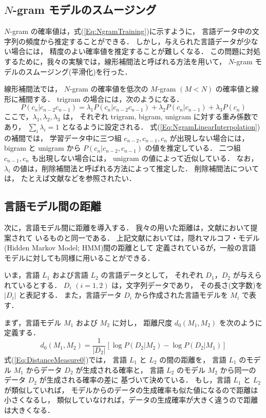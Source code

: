 \subsection{$N$-gram モデルのスムージング}

$N$-gram の確率値は，式(\ref{Eq:NgramTraining})に示すように，
言語データ中の文字列の頻度から推定することができる．
しかし，与えられた言語データが少ない場合には，
精度のよい確率値を推定することが難しくなる．
この問題に対処するために，我々の実験では，線形補間法と呼ばれる方法を用いて，
$N$-gram モデルのスムージング(平滑化)を行った．

線形補間法では，
$N$-gram の確率値を低次の $M$-gram $(M < N)$ の確率値と線形に補間する．
trigram の場合には，次のようになる．
\begin{equation}
  P(c_{n}|c_{n-2} c_{n-1})
 = \lambda_{1} P(c_{n}|c_{n-2} c_{n-1})
   + \lambda_{2} P(c_{n}|c_{n-1}) + \lambda_{3} P(c_{n})
\label{Eq:NgramLinearInterpolation}
\end{equation}
ここで，$\lambda_{1},\lambda_{2},\lambda_{3}$ は，
それぞれ trigram, bigram, unigram に対する重み係数であり，
$\displaystyle \sum_{i} \lambda_{i} = 1$ となるように設定される．
式(\ref{Eq:NgramLinearInterpolation})の補間では，
学習データ中に三つ組 $c_{n-2}, c_{n-1}, c_{n}$ が出現しない場合には，
bigram と unigram から $P(c_{n}|c_{n-2}, c_{n-1})$ の値を推定している．
二つ組 $c_{n-1}, c_{n}$ も出現しない場合には，
unigram の値によって近似している．
なお，$\lambda_{i}$ の値は，削除補間法と呼ばれる方法によって推定した．
削除補間法については，
たとえば文献\cite{Jelinek80,Kita96Book}などを参照されたい．


\subsection{言語モデル間の距離}

次に，言語モデル間に距離を導入する．
我々の用いた距離は，文献\cite{Juang85,Rabiner93}において提案されて
いるものと同一である．
上記文献においては，隠れマルコフ・モデル(Hidden Markov Model; HMM)間の距離として
定義されているが，一般の言語モデルに対しても同様に用いることができる．

いま，言語 $L_1$ および言語 $L_2$ の言語データとして，
それぞれ $D_1$，$D_2$ が与えられているとする．
$D_i$ $(i=1,2)$ は，文字列データであり，
その長さ(文字数)を $|D_i|$ と表記する．
また，言語データ $D_i$ から作成された言語モデルを $M_i$ で表す．

まず，言語モデル $M_1$ および $M_2$ に対し，
距離尺度 $d_0(M_1, M_2)$ を次のように定義する．
\begin{equation}
        d_0(M_1, M_2) = \frac{1}{|D_2|}
                \left [
                \log P(D_2|M_2) - \log P(D_2|M_1)
                \right ]
        \label{Eq:DistanceMeasure0}
\end{equation}
式(\ref{Eq:DistanceMeasure0})では，
言語 $L_1$ と $L_2$ の間の距離を，
言語 $L_1$ のモデル $M_1$ からデータ $D_2$ が生成される確率と，
言語 $L_2$ のモデル $M_2$ から同一のデータ $D_2$ が生成される確率の差に
基づいて決めている．
もし，言語 $L_1$ と $L_2$ が類似していれば，
モデルからのデータの生成確率も似た値になるので距離は小さくなるし，
類似していなければ，データの生成確率が大きく違うので距離は大きくなる．

